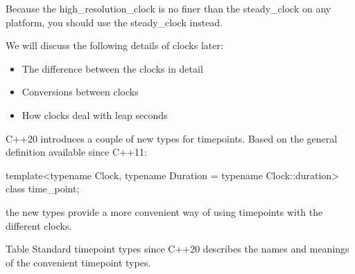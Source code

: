 Because the high\_resolution\_clock is no finer than the steady\_clock on any platform, you should use the steady\_clock instead.

We will discuss the following details of clocks later:

\begin{itemize}
\item 
The difference between the clocks in detail

\item 
Conversions between clocks

\item 
How clocks deal with leap seconds
\end{itemize}


C++20 introduces a couple of new types for timepoints. Based on the general definition available since C++11:

\begin{cpp}
template<typename Clock, typename Duration = typename Clock::duration>
class time_point;
\end{cpp}

the new types provide a more convenient way of using timepoints with the different clocks.

Table Standard timepoint types since C++20 describes the names and meanings of the convenient timepoint types.

